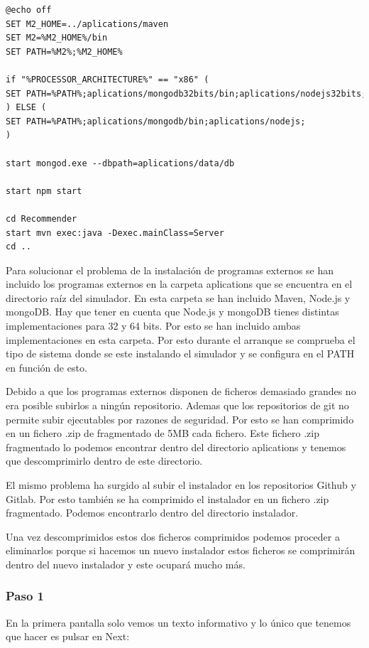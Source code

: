 \begin{lstlisting}[language=xml, frame=single]
@echo off
SET M2_HOME=../aplications/maven
SET M2=%M2_HOME%/bin
SET PATH=%M2%;%M2_HOME%

if "%PROCESSOR_ARCHITECTURE%" == "x86" ( 
SET PATH=%PATH%;aplications/mongodb32bits/bin;aplications/nodejs32bits;
) ELSE (
SET PATH=%PATH%;aplications/mongodb/bin;aplications/nodejs;
)

start mongod.exe --dbpath=aplications/data/db

start npm start

cd Recommender
start mvn exec:java -Dexec.mainClass=Server
cd ..
\end{lstlisting}

Para solucionar el problema de la instalación de programas externos se han incluido los programas externos en la carpeta aplications que se encuentra en el directorio raíz del simulador. En esta carpeta se han incluido Maven, Node.js y mongoDB. Hay que tener en cuenta que Node.js y mongoDB tienes distintas implementaciones para 32 y 64 bits. Por esto se han incluido ambas implementaciones en esta carpeta. Por esto durante el arranque se comprueba el tipo de sistema donde se este instalando el simulador y se configura en el PATH en función de esto.

Debido a que los programas externos disponen de ficheros demasiado grandes no era posible subirlos a ningún repositorio. Ademas que los repositorios de git no permite subir ejecutables por razones de seguridad. Por esto se han comprimido en un fichero .zip de fragmentado de 5MB cada fichero. Este fichero .zip fragmentado lo podemos encontrar dentro del directorio aplications y tenemos que descomprimirlo dentro de este directorio. 

El mismo problema ha surgido al subir el instalador en los repositorios Github y Gitlab. Por esto también se ha comprimido el instalador en un fichero .zip fragmentado. Podemos encontrarlo dentro del directorio instalador.

Una vez descomprimidos estos dos ficheros comprimidos podemos proceder a eliminarlos porque si hacemos un nuevo instalador estos ficheros se comprimirán dentro del nuevo instalador y este ocupará mucho más. 

\subsubsection{Paso 1}

En la primera pantalla solo vemos un texto informativo y lo único que tenemos que hacer es pulsar en Next:

